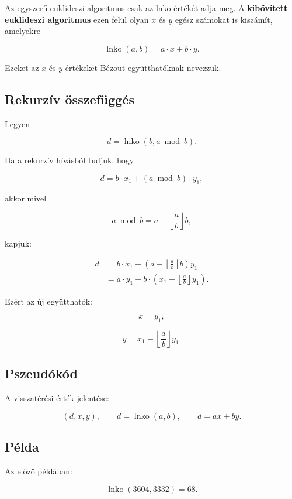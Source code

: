Az egyszerű euklideszi algoritmus csak az lnko értékét adja meg. A \textbf{kibővített euklideszi algoritmus} ezen felül olyan $x$ és $y$ egész számokat is kiszámít, amelyekre

\[
\operatorname{lnko}(a,b)=a\cdot x+b\cdot y.
\]

Ezeket az $x$ és $y$ értékeket Bézout-együtthatóknak nevezzük.

\subsection{Rekurzív összefüggés}

Legyen

\[
d=\operatorname{lnko}(b,a\bmod b).
\]

Ha a rekurzív hívásból tudjuk, hogy

\[
d=b\cdot x_1+(a\bmod b)\cdot y_1,
\]

akkor mivel

\[
a\bmod b=a-\left\lfloor\frac{a}{b}\right\rfloor b,
\]

kapjuk:

\[
\begin{aligned}
d &= b\cdot x_1+\left(a-\left\lfloor\frac{a}{b}\right\rfloor b\right)y_1 \\
  &= a\cdot y_1+b\cdot\left(x_1-\left\lfloor\frac{a}{b}\right\rfloor y_1\right).
\end{aligned}
\]

Ezért az új együtthatók:

\[
x=y_1,
\]

\[
y=x_1-\left\lfloor\frac{a}{b}\right\rfloor y_1.
\]

\subsection{Pszeudókód}


A visszatérési érték jelentése:

\[
(d,x,y),\qquad d=\operatorname{lnko}(a,b),\qquad d=ax+by.
\]

\subsection{Példa}

Az előző példában:

\[
\operatorname{lnko}(3604,3332)=68.
\]

